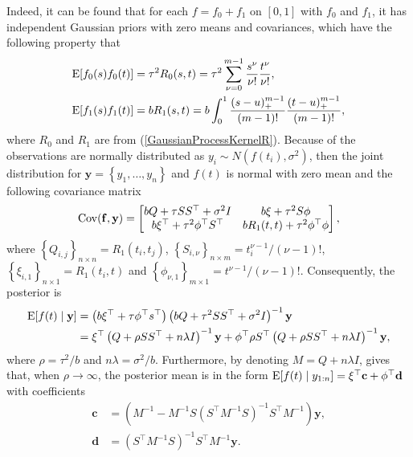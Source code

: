 Indeed, it can be found that for each $f=f_0+f_1$ on $[0,1]$ with $f_0$ and $f_1$, it has independent Gaussian priors with zero means and covariances, which have the following property that 
\begin{align*}
\mathrm{E} \lbrack f_0(s)f_0(t)\rbrack  &= \tau^2 R_0(s,t)=\tau^2 \sum_{\nu=0}^{m-1}\frac{s^\nu}{\nu!}\frac{t^\nu}{\nu!}, \\
\mathrm{E} \lbrack f_1(s)f_1(t) \rbrack &= bR_1(s,t) = b\int_{0}^{1} \frac{(s-u)_+^{m-1}}{(m-1)!} \frac{(t-u)_+^{m-1}}{(m-1)!},
\end{align*}
where $R_0$ and $R_1$ are from (\ref{GaussianProcessKernelR}). Because of the observations are normally distributed as $y_i\sim N(f(t_i),\sigma^2)$, then the joint distribution for $\mathbf{y} = \left\lbrace y_1,\ldots,y_n\right\rbrace$ and $f(t)$ is normal with zero mean and the following covariance matrix 
\begin{align*}\mathrm{Cov} (\mathbf{f},\mathbf{y}) = 
\begin{bmatrix}
bQ+\tau SS^\top+\sigma^2 I & b\xi +\tau^2 S\phi \\
b\xi^\top + \tau^2\phi^\top S^\top & bR_1(t,t) +\tau^2\phi^\top \phi
\end{bmatrix},
\end{align*}
where $\left\lbrace Q_{i,j}\right\rbrace_{n\times n}=R_1(t_i,t_j)$, $\left\lbrace S_{i,\nu}\right\rbrace_{n\times m}=t_i^{\nu-1}/(\nu-1)!$, $\left\lbrace \xi_{i,1}\right\rbrace_{n\times 1}=R_1(t_i,t)$ and $\left\lbrace \phi_{\nu,1}\right\rbrace_{m\times 1}=t^{\nu-1}/(\nu-1)!$. 
Consequently, the posterior is 
\begin{equation}
\begin{split}
\mathrm{E} \lbrack f(t)\mid\mathbf{y}\rbrack &= \left(b\xi^\top +\tau \phi^\top s^\top\right)\left(bQ+\tau^2 SS^\top+\sigma^2I\right)^{-1}\mathbf{y} \\
&= \xi^\top\left(Q+\rho SS^\top+n\lambda I\right)^{-1}\mathbf{y}+ \phi^\top\rho S^\top\left(Q+\rho SS^\top +n\lambda I\right)^{-1}\mathbf{y},
\end{split}
\end{equation}
where $\rho = \tau^2/b$ and $n\lambda=\sigma^2/b$. Furthermore, by denoting $M=Q+n\lambda I$, \cite{gu2013smoothing} gives that, when $\rho\rightarrow \infty$, the posterior mean is in the form $\mathrm{E}\lbrack f(t)\mid y_{1:n}\rbrack = \xi^\top\mathbf{c}+\phi^\top\mathbf{d}$ with coefficients
\begin{align}
\mathbf{c}&=\left(M^{-1}-M^{-1}S\left(S^\top M^{-1}S\right)^{-1}S^\top M^{-1}\right)\mathbf{y},\\
\mathbf{d}&=\left(S^\top M^{-1}S\right)^{-1}S^\top M^{-1}\mathbf{y}.
\end{align}

